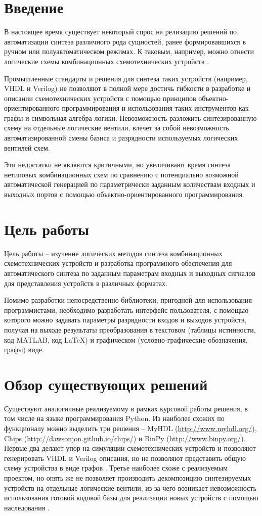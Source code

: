 \documentclass[document.tex]{subfiles}
\begin{document}
\clearpage\section*{Введение}
В настоящее время существует некоторый спрос на релизацию решений по
автоматизации синтеза различного рода сущностей, ранее формировавшихся в ручном
или полуавтоматическом режимах. К таковым, например, можно отнести
логические схемы комбинационных схемотехнических устройств \cite{autogen}.

Промышленные стандарты и решения для синтеза таких устройств (например, VHDL и Verilog) не
позволяют в полной мере достичь гибкости в разработке и описании
схемотехнических устройств с помощью принципов объектно-ориентированного 
программирования и использования таких инструментов как графы и символьная 
алгебра логики. Невозможность разложить синтезированную схему на
отдельные логические вентили, влечет за собой
невозможность автоматизированной смены базиса и разрядности используемых
логических вентилей схем.

Эти недостатки не являются критичными, но увеличивают время 
синтеза нетиповых комбинационных схем по сравнению с потенциально возможной 
автоматической генерацией по параметрически заданным количествам входных и 
выходных портов с помощью объектно-ориентированного программирования. 

\clearpage\section{Цель работы}
Цель работы -- изучение логических методов синтеза комбинационных
схемотехнических устройств и разработка программного обеспечения для
автоматического синтеза по заданным параметрам входных и выходных сигналов для
представления устройств в различных форматах. 

Помимо разработки непосредственно библиотеки, пригодной для использования
программистами, необходимо разработать интерфейс пользователя, с помощью
которого можно задавать параметры разрядности входов и выходов устройств,
получая на выходе результаты преобразования в текстовом (таблицы истинности, код
MATLAB, код \LaTeX) и графическом (условно-графические обозначения, графы) виде.

\section{Обзор существующих решений}
Существуют аналогичные реализуемому в рамках курсовой работы решения, в том
числе на языке программирования Python. Из наиболее схожих по функционалу можно
выделить три решения -- MyHDL ({\url{http://www.myhdl.org/}}), Chips
({\url{http://dawsonjon.github.io/chips/}}) и BinPy
({\url{http://www.binpy.org/}}). Первые два делают упор на симуляции
схемотехнических устройств и позволяют генерировать VHDL и Verilog описания, но
не позволяют представить общую схему устройства в виде графов \cite{myhdldoc,
chipsdoc}.
Третье наиболее схоже с реализуемым проектом, но опять же не позволяет
производить декомпозицию синтезируемых устройств на отдельные логические
вентили, из-за чего возникает невозможность использования готовой кодовой базы
для реализации новых устройств с помощью наследования \cite{binpydoc}.
\end{document}
